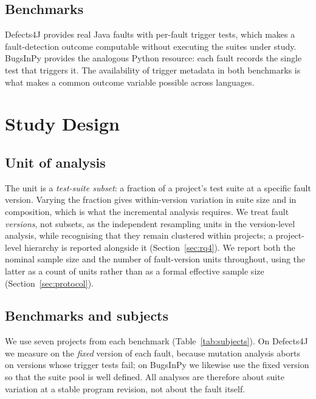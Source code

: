 \documentclass[preprint,12pt]{elsarticle}
\begin{document}
\subsection{Benchmarks}

Defects4J \cite{just2014defects4j} provides real Java faults with
per-fault trigger tests, which makes a fault-detection outcome computable
without executing the suites under study. BugsInPy
\cite{widyasari2020bugsinpy} provides the analogous Python resource: each
fault records the single test that triggers it. The availability of trigger
metadata in both benchmarks is what makes a common outcome variable
possible across languages.

\section{Study Design}
\label{sec:design}

\subsection{Unit of analysis}

The unit is a \emph{test-suite subset}: a fraction of a project's test suite
at a specific fault version. Varying the fraction gives within-version
variation in suite size and in composition, which is what the incremental
analysis requires. We treat fault \emph{versions}, not subsets, as the
independent resampling units in the version-level analysis, while
recognising that they remain clustered within projects; a project-level
hierarchy is reported alongside it (Section~\ref{sec:rq4}). We report both
the nominal sample size and the number of fault-version units throughout,
using the latter as a count of units rather than as a formal effective
sample size (Section~\ref{sec:protocol}).

\subsection{Benchmarks and subjects}

We use seven projects from each benchmark (Table~\ref{tab:subjects}). On
Defects4J we measure on the \emph{fixed} version of each fault, because
mutation analysis aborts on versions whose trigger tests fail; on BugsInPy
we likewise use the fixed version so that the suite pool is well defined.
All analyses are therefore about suite variation at a stable program
revision, not about the fault itself.
\end{document}
